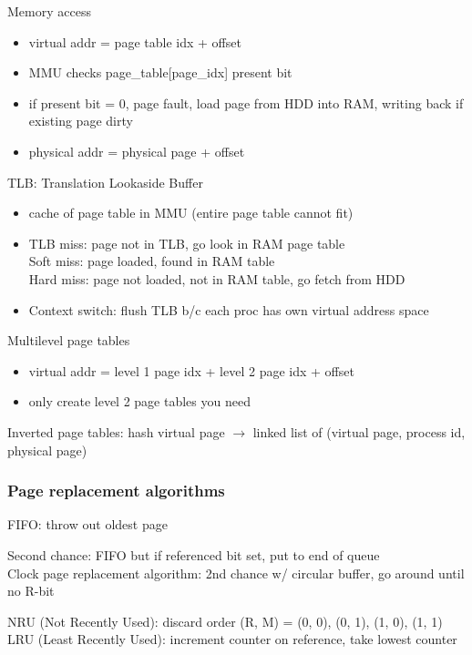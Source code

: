 \documentclass[10pt]{article}
\begin{document}
Memory access
\begin{itemize}
    \item virtual addr = page table idx + offset
    \item MMU checks page\_table[page\_idx] present bit
    \item if present bit = 0, page fault, load page from HDD into RAM, writing back if existing page dirty
    \item physical addr = physical page + offset
\end{itemize}

TLB: Translation Lookaside Buffer
\begin{itemize}
    \item cache of page table in MMU (entire page table cannot fit)
    \item TLB miss: page not in TLB, go look in RAM page table\\
        Soft miss: page loaded, found in RAM table\\
        Hard miss: page not loaded, not in RAM table, go fetch from HDD
    \item Context switch: flush TLB b/c each proc has own virtual address space
\end{itemize}

Multilevel page tables
\begin{itemize}
    \item virtual addr = level 1 page idx + level 2 page idx + offset
    \item only create level 2 page tables you need
\end{itemize}

Inverted page tables: hash virtual page $\to$ linked list of (virtual page, process id, physical page)

\subsubsection{Page replacement algorithms}
FIFO: throw out oldest page

Second chance: FIFO but if referenced bit set, put to end of queue\\


Clock page replacement algorithm: 2nd chance w/ circular buffer, go around until no R-bit

NRU (Not Recently Used): discard order (R, M) = (0, 0), (0, 1), (1, 0), (1, 1)\\


LRU (Least Recently Used): increment counter on reference, take lowest counter
\end{document}
